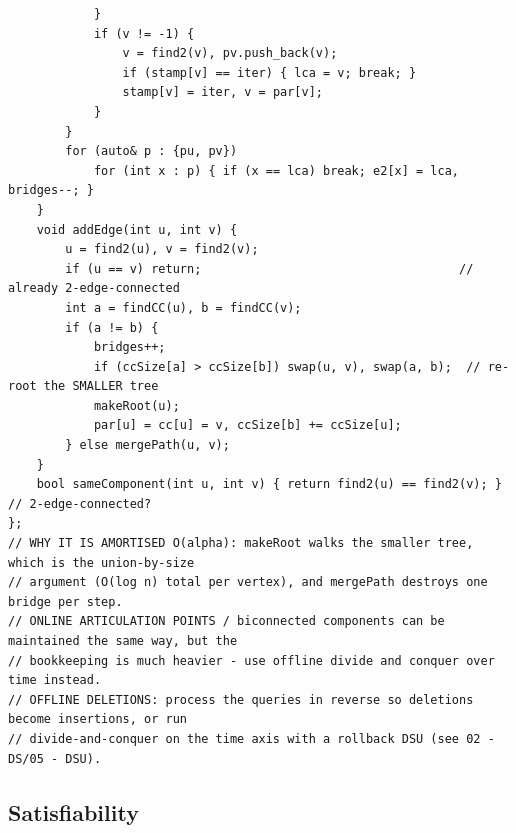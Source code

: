 \documentclass[9pt,a4paper,twocolumn]{extarticle}
\begin{document}
\begin{lstlisting}
            }
            if (v != -1) {
                v = find2(v), pv.push_back(v);
                if (stamp[v] == iter) { lca = v; break; }
                stamp[v] = iter, v = par[v];
            }
        }
        for (auto& p : {pu, pv})
            for (int x : p) { if (x == lca) break; e2[x] = lca, bridges--; }
    }
    void addEdge(int u, int v) {
        u = find2(u), v = find2(v);
        if (u == v) return;                                    // already 2-edge-connected
        int a = findCC(u), b = findCC(v);
        if (a != b) {
            bridges++;
            if (ccSize[a] > ccSize[b]) swap(u, v), swap(a, b);  // re-root the SMALLER tree
            makeRoot(u);
            par[u] = cc[u] = v, ccSize[b] += ccSize[u];
        } else mergePath(u, v);
    }
    bool sameComponent(int u, int v) { return find2(u) == find2(v); }   // 2-edge-connected?
};
// WHY IT IS AMORTISED O(alpha): makeRoot walks the smaller tree, which is the union-by-size
// argument (O(log n) total per vertex), and mergePath destroys one bridge per step.
// ONLINE ARTICULATION POINTS / biconnected components can be maintained the same way, but the
// bookkeeping is much heavier - use offline divide and conquer over time instead.
// OFFLINE DELETIONS: process the queries in reverse so deletions become insertions, or run
// divide-and-conquer on the time axis with a rollback DSU (see 02 - DS/05 - DSU).
\end{lstlisting}

\subsection{Satisfiability}

\filbreak
\end{document}
